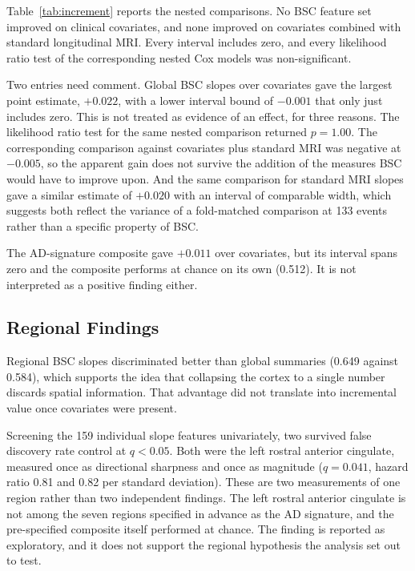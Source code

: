 \documentclass[blue]{ludusofficial}  %
\begin{document}
Table~\ref{tab:increment} reports the nested comparisons. No BSC feature set improved on clinical covariates, and none improved on covariates combined with standard longitudinal MRI. Every interval includes zero, and every likelihood ratio test of the corresponding nested Cox models was non-significant.

Two entries need comment. Global BSC slopes over covariates gave the largest point estimate, $+0.022$, with a lower interval bound of $-0.001$ that only just includes zero. This is not treated as evidence of an effect, for three reasons. The likelihood ratio test for the same nested comparison returned $p = 1.00$. The corresponding comparison against covariates plus standard MRI was negative at $-0.005$, so the apparent gain does not survive the addition of the measures BSC would have to improve upon. And the same comparison for standard MRI slopes gave a similar estimate of $+0.020$ with an interval of comparable width, which suggests both reflect the variance of a fold-matched comparison at 133 events rather than a specific property of BSC.

The AD-signature composite gave $+0.011$ over covariates, but its interval spans zero and the composite performs at chance on its own (0.512). It is not interpreted as a positive finding either.

\subsection{Regional Findings}

Regional BSC slopes discriminated better than global summaries (0.649 against 0.584), which supports the idea that collapsing the cortex to a single number discards spatial information. That advantage did not translate into incremental value once covariates were present.

Screening the 159 individual slope features univariately, two survived false discovery rate control at $q<0.05$. Both were the left rostral anterior cingulate, measured once as directional sharpness and once as magnitude ($q=0.041$, hazard ratio 0.81 and 0.82 per standard deviation). These are two measurements of one region rather than two independent findings. The left rostral anterior cingulate is not among the seven regions specified in advance as the AD signature, and the pre-specified composite itself performed at chance. The finding is reported as exploratory, and it does not support the regional hypothesis the analysis set out to test.
\end{document}
